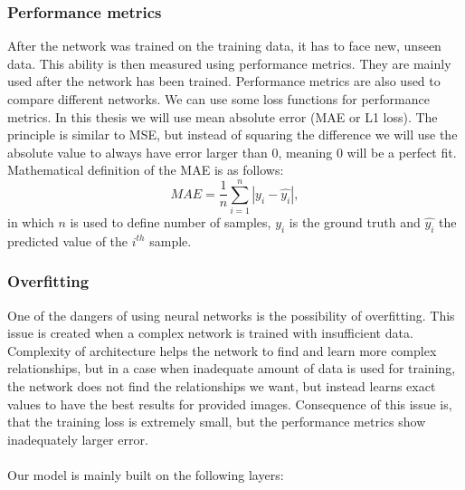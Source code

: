 \subsubsection{Performance metrics}
After the network was trained on the training data, it has to face new, unseen data. This ability is then measured using performance metrics. They are mainly used after the network has been trained. Performance metrics are also used to compare different networks. We can use some loss functions for performance metrics. In this thesis we will use mean absolute error (MAE or L1 loss). The principle is similar to MSE, but instead of squaring the difference we will use the absolute value to always have error larger than 0, meaning 0 will be a perfect fit. Mathematical definition of the MAE is as follows:
\begin{equation}
	MAE = \frac{1}{n}\sum_{i=1}^{n}|y_i -  \hat{y_i}|,
\end{equation}
in which $n$ is used to define number of samples, $y_i$ is the ground truth and $\hat{y_i}$ the predicted value of the $i^{th}$ sample.

\subsubsection{Overfitting}
One of the dangers of using neural networks is the possibility of overfitting. This issue is created when a complex network is trained with insufficient data. Complexity of architecture helps the network to find and learn more complex relationships, but in a case when inadequate amount of data is used for training, the network does not find the relationships we want, but instead learns exact values to have the best results for provided images. Consequence of this issue is, that the training loss is extremely small, but the performance metrics show inadequately larger error.
\\\\

Our model is mainly built on the following layers:

